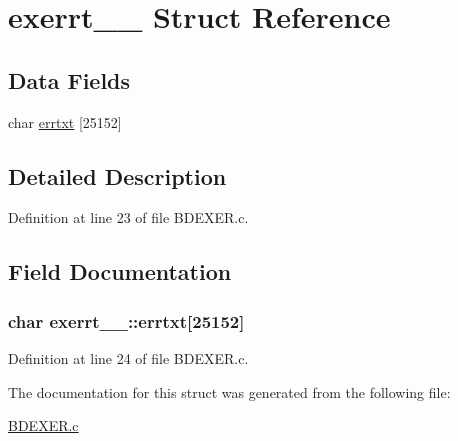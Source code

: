 \hypertarget{structexerrt__1__}{}\section{exerrt\+\_\+\_\+ Struct Reference}
\label{structexerrt__1__}
\subsection*{Data Fields}
\begin{DoxyCompactItemize}
\item 
char \hyperlink{structexerrt__1___aed8e1fb02f83480e8fa7ddf1fc0a081f}{errtxt} \mbox{[}25152\mbox{]}
\end{DoxyCompactItemize}


\subsection{Detailed Description}


Definition at line 23 of file B\+D\+E\+X\+E\+R.\+c.



\subsection{Field Documentation}
\subsubsection[{\texorpdfstring{errtxt}{errtxt}}]{\setlength{\rightskip}{0pt plus 5cm}char exerrt\+\_\+\_\+\+::errtxt\mbox{[}25152\mbox{]}}\hypertarget{structexerrt__1___aed8e1fb02f83480e8fa7ddf1fc0a081f}{}\label{structexerrt__1___aed8e1fb02f83480e8fa7ddf1fc0a081f}


Definition at line 24 of file B\+D\+E\+X\+E\+R.\+c.



The documentation for this struct was generated from the following file\+:\begin{DoxyCompactItemize}
\item 
\hyperlink{BDEXER_8c}{B\+D\+E\+X\+E\+R.\+c}\end{DoxyCompactItemize}

